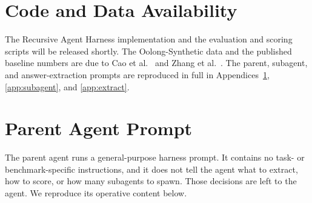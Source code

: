 \documentclass[sigconf,nonacm]{acmart}
\begin{document}



\section*{Code and Data Availability}
The Recursive Agent Harness implementation and the evaluation and scoring scripts will be
released shortly. The Oolong-Synthetic data and the published baseline numbers are due to
Cao et al.~\cite{cao2026oolong} and Zhang et al.~\cite{zhang2024rlm}. The parent, subagent,
and answer-extraction prompts are reproduced in full in Appendices~\ref{app:prompt},
\ref{app:subagent}, and \ref{app:extract}.




\appendix
\newpage
\section{Parent Agent Prompt}
\label{app:prompt}
The parent agent runs a general-purpose harness prompt. It contains no task- or
benchmark-specific instructions, and it does not tell the agent what to extract, how to score,
or how many subagents to spawn. Those decisions are left to the agent. We reproduce its
operative content below.
\end{document}
